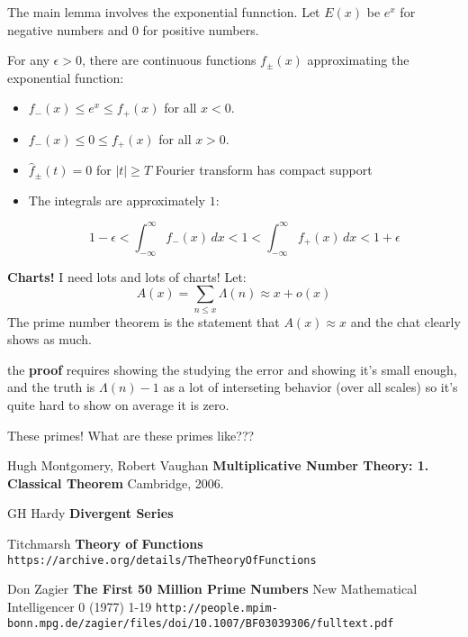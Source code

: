 \documentclass[12pt]{article}
\begin{document}
\newpage

\noindent The main lemma involves the exponential funnction.  Let $E(x)$ be $e^x$ for negative numbers and $0$ for positive numbers. \newline

\noindent For any $\epsilon > 0$, there are continuous functions $f_\pm (x)$ approximating the exponential function:
\begin{itemize}
\item $f_-(x) \leq e^x \leq f_+(x)$ for all $x  < 0$.
\item $f_-(x) \leq 0 \leq f_+(x)$ \hspace{0.40em}for all $x  > 0$.
\item $\hat{f}_\pm(t) = 0$ for $|t| \geq T$ Fourier transform has compact support
\item The integrals are approximately $1$:


$$1 - \epsilon < 
\int_{-\infty}^\infty f_-(x) \, dx  <
1  <  
 \int_{-\infty}^\infty f_+(x) \, dx < 1 + \epsilon $$
\end{itemize}

\newpage

\noindent \textbf{Charts!}  I need lots and lots of charts! Let: 
$$ A(x) = \sum_{n \leq x} \Lambda(n) \approx x + o(x)$$
The prime number theorem is the statement that $A(x) \approx x$ and the chat clearly shows as much. \newline

\noindent the \textbf{proof} requires showing the studying the error and showing it's small enough, and the truth is $\Lambda(n) - 1$ as a lot of interseting behavior (over all scales) so it's quite hard to show on average it is zero. \newline

\noindent These primes! What are these primes like???
 


\newpage

\selectfont \fontsize{12}{10}\selectfont

\begin{thebibliography}{}

\item Hugh Montgomery, Robert Vaughan \textbf{Multiplicative Number Theory: 1.  Classical Theorem} Cambridge, 2006.

\item GH Hardy \textbf{Divergent Series}

\item Titchmarsh \textbf{Theory of Functions} \texttt{https://archive.org/details/TheTheoryOfFunctions}

\item Don Zagier \textbf{The First 50 Million Prime Numbers} New Mathematical Intelligencer 0 (1977) 1-19  \newline\texttt{http://people.mpim-bonn.mpg.de/zagier/files/doi/10.1007/BF03039306/fulltext.pdf}



\end{thebibliography}
\end{document}
